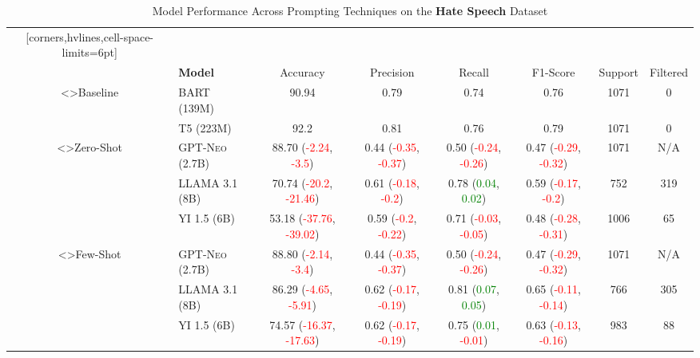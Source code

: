 \documentclass[twocolumn]{article}
\begin{document}
\begin{sidewaystable}[ht]
\centering
\caption{Model Performance Across Prompting Techniques on the \textbf{Hate Speech} Dataset}
\vspace{10pt}
\label{tab:model_performance_hate_speech}
\begin{NiceTabular}{cl*{6}{c}}[corners,hvlines,cell-space-limits=6pt]
    &   
        &  \\
    & \textbf{Model}  
        & Accuracy & Precision & Recall & F1-Score & Support & Filtered \\

<\rotate>{Baseline}
	 & \textsc{BART (139M)} & 90.94 & 0.79 & 0.74 & 0.76 & 1071 & 0 \\
	 & \textsc{T5 (223M)} & 92.2 & 0.81 & 0.76 & 0.79 & 1071 & 0 \\

<\rotate>{Zero-Shot}
	 & \textsc{GPT-Neo (2.7B)} & 88.70 (\textcolor{Red}{-2.24}, \textcolor{Red}{-3.5}) & 0.44 (\textcolor{Red}{-0.35}, \textcolor{Red}{-0.37}) & 0.50 (\textcolor{Red}{-0.24}, \textcolor{Red}{-0.26}) & 0.47 (\textcolor{Red}{-0.29}, \textcolor{Red}{-0.32}) & 1071 & N/A \\
	 & \textsc{LLAMA 3.1 (8B)} & 70.74 (\textcolor{Red}{-20.2}, \textcolor{Red}{-21.46}) & 0.61 (\textcolor{Red}{-0.18}, \textcolor{Red}{-0.2}) & 0.78 (\textcolor{Green}{0.04}, \textcolor{Green}{0.02}) & 0.59 (\textcolor{Red}{-0.17}, \textcolor{Red}{-0.2}) & 752 & 319 \\
	 & \textsc{YI 1.5 (6B)} & 53.18 (\textcolor{Red}{-37.76}, \textcolor{Red}{-39.02}) & 0.59 (\textcolor{Red}{-0.2}, \textcolor{Red}{-0.22}) & 0.71 (\textcolor{Red}{-0.03}, \textcolor{Red}{-0.05}) & 0.48 (\textcolor{Red}{-0.28}, \textcolor{Red}{-0.31}) & 1006 & 65 \\

<\rotate>{Few-Shot}
	 & \textsc{GPT-Neo (2.7B)} & 88.80 (\textcolor{Red}{-2.14}, \textcolor{Red}{-3.4}) & 0.44 (\textcolor{Red}{-0.35}, \textcolor{Red}{-0.37}) & 0.50 (\textcolor{Red}{-0.24}, \textcolor{Red}{-0.26}) & 0.47 (\textcolor{Red}{-0.29}, \textcolor{Red}{-0.32}) & 1071 & N/A \\
	 & \textsc{LLAMA 3.1 (8B)} & 86.29 (\textcolor{Red}{-4.65}, \textcolor{Red}{-5.91}) & 0.62 (\textcolor{Red}{-0.17}, \textcolor{Red}{-0.19}) & 0.81 (\textcolor{Green}{0.07}, \textcolor{Green}{0.05}) & 0.65 (\textcolor{Red}{-0.11}, \textcolor{Red}{-0.14}) & 766 & 305 \\
	 & \textsc{YI 1.5 (6B)} & 74.57 (\textcolor{Red}{-16.37}, \textcolor{Red}{-17.63}) & 0.62 (\textcolor{Red}{-0.17}, \textcolor{Red}{-0.19}) & 0.75 (\textcolor{Green}{0.01}, \textcolor{Red}{-0.01}) & 0.63 (\textcolor{Red}{-0.13}, \textcolor{Red}{-0.16}) & 983 & 88 \\


\end{NiceTabular}
\end{sidewaystable}
\end{document}
